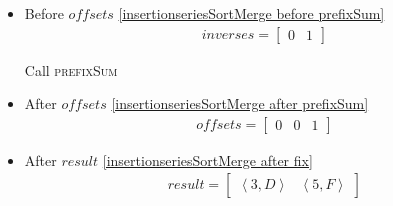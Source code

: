 \begin{frame}[containsverbatim]{\insertionseriesexampleframe}
\begin{columns}[c]
\begin{column}{0.65\textwidth}
\begin{multicols}{2}
\begin{itemize}
                            \item Before $offsets$ \cref{insertionseriesSortMerge before prefixSum}
                            \begin{align*}
                                inverses = \begin{bmatrix}0 & 1\end{bmatrix}
                            \end{align*}

                            Call \textsc{prefixSum}
    
                            \item After $offsets$ \cref{insertionseriesSortMerge after prefixSum}
                            \begin{align*}
                                offsets = \begin{bmatrix}0 & 0 & 1\end{bmatrix}
                            \end{align*}
    
                            \item After $result$ \cref{insertionseriesSortMerge after fix}
                            \begin{align*}
                                result = \begin{bmatrix}\left<3, D\right> & \left<5, F\right>\end{bmatrix}
                            \end{align*}
                        \end{itemize}
                    \end{multicols}
                \end{column}
            \end{columns}
        \end{frame}

